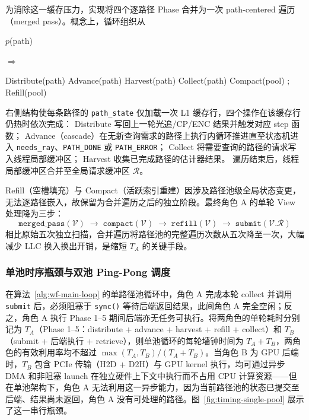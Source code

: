 为消除这一缓存压力，实现将四个逐路径 Phase 合并为一次 path-centered 遍历（merged pass）。概念上，循环组织从
\begin{center}
\begin{minipage}{0.42\textwidth}
\begin{algorithmic}[0]
    \STATE $p$(path)
  \ENDFOR
\ENDFOR
\end{algorithmic}
\end{minipage}%
\hfill$\Longrightarrow$\hfill%
\begin{minipage}{0.42\textwidth}
\begin{algorithmic}[0]
  \STATE Distribute(path)
  \STATE Advance(path)
  \STATE Harvest(path)
  \STATE Collect(path)
\ENDFOR
\STATE Compact(pool) ; Refill(pool)
\end{algorithmic}
\end{minipage}
\end{center}
右侧结构使每条路径的 \texttt{path\_state} 仅加载一次 L1 缓存行，四个操作在该缓存行仍热时依次完成：
Distribute 写回上一轮光追/CP/ENC 结果并触发对应 step 函数；
Advance（cascade）在无新查询需求的路径上执行内循环推进直至状态机进入 \texttt{needs\_ray}、\texttt{PATH\_DONE} 或 \texttt{PATH\_ERROR}；
Collect 将需要查询的路径的请求写入线程局部缓冲区；
Harvest 收集已完成路径的估计器结果。
遍历结束后，线程局部缓冲区合并至全局请求缓冲区 $\mathcal{R}$。

Refill（空槽填充）与 Compact（活跃索引重建）因涉及路径池级全局状态变更，无法逐路径嵌入，故保留为合并遍历之后的独立阶段。最终角色 A 的单轮 View 处理降为三步：
\[
  \texttt{merged\_pass}(\mathcal{V}) \;\to\; \texttt{compact}(\mathcal{V}) \;\to\; \texttt{refill}(\mathcal{V}) \;\to\; \texttt{submit}(\mathcal{V}.\mathcal{R})
\]
相比原始五次独立扫描，合并遍历将路径池的完整遍历次数从五次降至一次，大幅减少 LLC 换入换出开销，是缩短 $T_A$ 的关键手段。

\subsubsection{单池时序瓶颈与双池 Ping-Pong 调度}

在算法~\ref{alg:wf-main-loop} 的单路径池循环中，角色 A 完成本轮 collect 并调用 \texttt{submit} 后，必须阻塞于 \texttt{sync()} 等待后端返回结果，此间角色 A 完全空闲；反之，角色 A 执行 Phase 1--5 期间后端亦无任务可执行。将两角色的单轮耗时分别记为 $T_A$（Phase 1--5：distribute + advance + harvest + refill + collect）和 $T_B$（submit + 后端执行 + retrieve），则单池循环的每轮墙钟时间为 $T_A + T_B$，两角色的有效利用率均不超过 $\max(T_A, T_B) / (T_A + T_B)$。当角色 B 为 GPU 后端时，$T_B$ 包含 PCIe 传输（H2D + D2H）与 GPU kernel 执行，均可通过异步 DMA 和非阻塞 launch 在独立硬件上下文中执行而不占用 CPU 计算资源——但在单池架构下，角色 A 无法利用这一异步能力，因为当前路径池的状态已提交至后端、结果尚未返回，角色 A 没有可处理的路径。图~\ref{fig:timing-single-pool} 展示了这一串行瓶颈。

